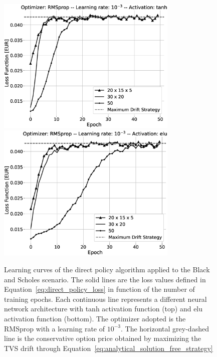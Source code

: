 \documentclass[runningheads]{m2ef}
\newcommand{\change}[1]{{\color{red} {#1}}}%
\begin{document}
	\begin{figure}[h!]
		\centering
		\includegraphics[width=3.4in]{BS_fine_tuning_RMSprop_tanh_grey.eps}
		\includegraphics[width=3.4in]{BS_fine_tuning_RMSprop_elu_grey.eps}
		\caption{Learning curves of the direct policy algorithm applied to the Black and Scholes \change{scenario}. The solid lines are the loss values defined in Equation~\eqref{eq:direct_policy_loss} in function of the number of training epochs. Each continuous line represents a different neural network architecture with tanh activation function (top) and elu activation function (bottom). The optimizer adopted is the RMSprop with a learning rate of $10^{-3}$. The horizontal grey-dashed line is the conservative option price obtained by maximizing the TVS drift through Equation~\eqref{eq:analytical_solution_free_strategy}}
		\label{fig:result_bs_rmsprop}
	\end{figure}  
\end{document}
